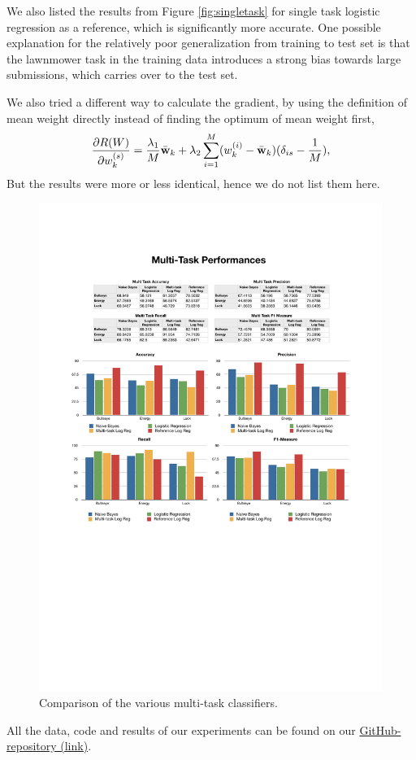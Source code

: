 We also listed the results from Figure \ref{fig:singletask} for single task logistic regression as a reference, which is significantly more accurate. One possible explanation for the relatively poor generalization from training to test set is that the lawnmower task in the training data introduces a strong bias towards large submissions, which carries over to the test set.

We also tried a different way to calculate the gradient, by using the definition of mean weight directly instead of finding the optimum of mean weight first, 
\begin{align*}
\frac{\partial R(W)}{\partial w_k^{(s)}} = \frac{\lambda_1}{M} \bar{\textbf{w}}_k + \lambda_2 \sum_{i=1}^{M}(w_k^{(i)} - \bar{\textbf{w}}_k)(\delta_{is} - \frac{1}{M}),
\end{align*}
But the results were more or less identical, hence we do not list them here.
%
\begin{figure}
    \centering
    \setlength{\tabcolsep}{0.0130\linewidth}
    \includegraphics[width=\linewidth]{figures/MultiTask}
    \caption{Comparison of the various multi-task classifiers.%
      \label{fig:multitask}}
\end{figure}


All the data, code and results of our experiments can be found on our 
\href{https://github.com/johnnyyan/515project}{GitHub-repository (link)}.

